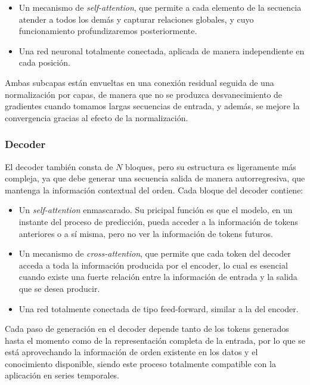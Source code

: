 \begin{itemize}
    \item Un mecanismo de \textit{self-attention}, que permite a cada elemento de la secuencia atender a todos los demás y capturar relaciones globales, y cuyo funcionamiento profundizaremos posteriormente.
    \item Una red neuronal totalmente conectada, aplicada de manera independiente en cada posición.
\end{itemize}

Ambas subcapas están envueltas en una conexión residual seguida de una normalización por capas, de manera que no se produzca desvanecimiento de gradientes cuando tomamos largas secuencias de entrada, y además, se mejore la convergencia gracias al efecto de la normalización.

\subsubsection{Decoder}
El decoder también consta de $N$ bloques, pero su estructura es ligeramente más compleja, ya que debe generar una secuencia salida de manera autorregresiva, que mantenga la información contextual del orden. Cada bloque del decoder contiene:

\begin{itemize}
    \item Un \textit{self-attention} enmascarado. Su pricipal función es que el modelo, en un instante del proceso de predicción, pueda acceder a la información de tokens anteriores o a sí misma, pero no ver la información de tokens futuros.
    \item Un mecanismo de \textit{cross-attention}, que permite que cada token del decoder acceda a toda la información producida por el encoder, lo cual es esencial cuando existe una fuerte relación entre la información de entrada y la salida que se desea producir.
    \item Una red totalmente conectada de tipo feed-forward, similar a la del encoder.
\end{itemize}

Cada paso de generación en el decoder depende tanto de los tokens generados hasta el momento como de la representación completa de la entrada, por lo que se está aprovechando la información de orden existente en los datos y el conocimiento disponible, siendo este proceso totalmente compatible con la aplicación en series temporales.\\

